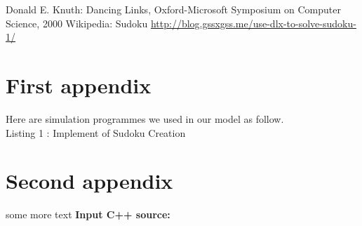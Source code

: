 \documentclass{mcmthesis}
\begin{document}
\begin{thebibliography}{99}
 Donald E. Knuth: Dancing Links, Oxford-Microsoft Symposium on Computer Science, 2000
	Wikipedia: Sudoku
\url{http://blog.gssxgss.me/use-dlx-to-solve-sudoku-1/}
\end{thebibliography}

\begin{appendices}

\section{First appendix}

Here are simulation programmes we used in our model as follow.\\

\centering
Listing 1 : Implement of Sudoku Creation











\section{Second appendix}
some more text \textcolor[rgb]{0.98,0.00,0.00}{\textbf{Input C++ source:}}


\end{appendices}
\end{document}
